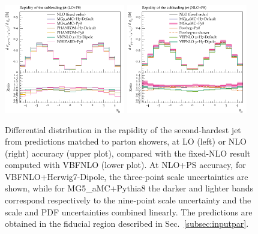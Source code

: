 \documentclass[twocolumn,epjc3]{svjour3} %
\newlength{\width}
\begin{document}
\begin{figure}[hbt]
\centering
\includegraphics[width=0.47\textwidth]{figures/LOPS/y_j2.pdf}
\includegraphics[width=0.47\textwidth]{figures/NLOPS/y_j2.pdf}
\caption{Differential distribution in the
rapidity of the second-hardest jet
from predictions matched to parton showers, at LO (left) or NLO (right) accuracy (upper plot), compared with the fixed-NLO result computed with {\sc VBFNLO} (lower plot). At NLO+PS accuracy, for
    {\sc VBFNLO}+{\sc Herwig7-Dipole}, the three-point scale uncertainties are shown, while for {\sc MG5\_aMC}+{\sc Pythia8} the darker and lighter bands correspond
    respectively to the nine-point scale uncertainty and the scale and PDF uncertainties combined linearly.
    The predictions are obtained in the fiducial region described in Sec.~\ref{subsec:inputpar}.}
\label{fig:PSy2}
\end{figure}
\end{document}
